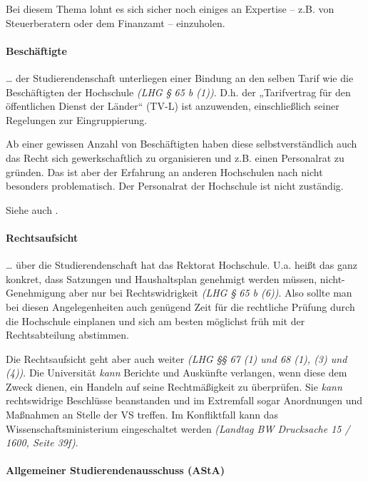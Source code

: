 \documentclass[
10pt,
a4paper,
twoside,								%
titlepage=false,							%
draft=false								%
]{scrartcl}
\begin{document}
Bei diesem Thema lohnt es sich sicher noch einiges an Expertise – z.B. von Steuerberatern oder dem Finanzamt – einzuholen.



\paragraph{Beschäftigte}\label{Glossar: Beschäftigte}

… der Studierendenschaft unterliegen einer Bindung an den selben Tarif wie die Beschäftigten der Hochschule \textit{(LHG § 65 b (1))}. D.h. der „Tarifvertrag für den öffentlichen Dienst der Länder“ (TV-L) ist anzuwenden, einschließlich seiner Regelungen zur Eingruppierung.

Ab einer gewissen Anzahl von Beschäftigten haben diese selbstverständlich auch das Recht sich gewerkschaftlich zu organisieren und z.B. einen Personalrat zu gründen. Das ist aber der Erfahrung an anderen Hochschulen nach nicht besonders problematisch. Der Personalrat der Hochschule ist nicht zuständig.

Siehe auch .


\paragraph{Rechtsaufsicht}

… über die Studierendenschaft hat das Rektorat Hochschule. U.a. heißt das ganz konkret, dass Satzungen und Haushaltsplan genehmigt werden müssen, nicht-Genehmigung aber nur bei Rechtswidrigkeit \textit{(LHG § 65 b (6))}. Also sollte man bei diesen Angelegenheiten auch genügend Zeit für die rechtliche Prüfung durch die Hochschule einplanen und sich am besten möglichst früh mit der Rechtsabteilung abstimmen.

Die Rechtsaufsicht geht aber auch weiter \textit{(LHG §§ 67 (1) und 68 (1), (3) und (4))}. Die Universität \emph{kann} Berichte und Auskünfte verlangen, wenn diese dem Zweck dienen, ein Handeln auf seine Rechtmäßigkeit zu überprüfen. Sie \emph{kann} rechtswidrige Beschlüsse beanstanden und im Extremfall sogar Anordnungen und Maßnahmen an Stelle der VS treffen. Im Konfliktfall kann das Wissenschaftsministerium eingeschaltet werden \textit{(Landtag BW Drucksache 15 / 1600, Seite 39f)}.



\paragraph{Allgemeiner Studierendenausschuss (AStA)}
\end{document}
